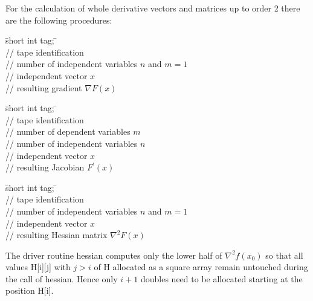 \documentclass[11pt,twoside]{article}
\begin{document}
For the calculation of whole derivative vectors and matrices up to order
2 there are the following procedures:
%
\begin{tabbing}
\hspace{0.5in}\={\sf short int tag;} \hspace{1.1in}\= \kill    %
\\
         \> // tape identification \\
                 \> // number of independent variables $n$ and $m=1$\\
           \> // independent vector $x$ \\
           \> // resulting gradient $\nabla F(x)$
\end{tabbing}
%
\begin{tabbing}
\hspace{0.5in}\={\sf short int tag;} \hspace{1.1in}\= \kill    %
\\
         \> // tape identification \\
                 \> // number of dependent variables $m$\\
                 \> // number of independent variables $n$\\
           \> // independent vector $x$ \\
        \> // resulting Jacobian $F^\prime (x)$
\end{tabbing}
%
\begin{tabbing}
\hspace{0.5in}\={\sf short int tag;} \hspace{1.1in}\= \kill    %
\\
         \> // tape identification \\
                 \> // number of independent variables $n$ and $m=1$\\
           \> // independent vector $x$ \\
        \> // resulting Hessian matrix $\nabla^2F(x)$ 
\end{tabbing}
%
The driver routine {\sf hessian} computes only the lower half of 
$\nabla^2f(x_0)$ so that all values {\sf H[i][j]} with $j>i$ 
of {\sf H} allocated as a square array remain untouched during the call
of {\sf hessian}. Hence only $i+1$ {\sf double}s  need to be 
allocated starting at the position {\sf H[i]}.
\end{document}
